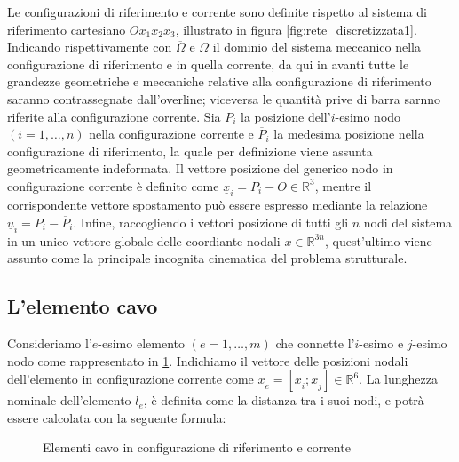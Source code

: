 \vspace{1em}
Le configurazioni di riferimento e corrente sono definite rispetto al sistema di riferimento cartesiano $Ox_{1}x_{2}x_{3}$, illustrato in figura \cref{fig:rete_discretizzata1}. Indicando rispettivamente con $\overline{\Omega}$ e $\Omega$ il dominio del sistema meccanico nella configurazione di riferimento e in quella corrente, da qui in avanti tutte le grandezze geometriche e meccaniche relative alla configurazione di riferimento saranno contrassegnate dall'overline; viceversa le quantità prive di barra sarnno riferite alla configurazione corrente. Sia $P_i$ la posizione dell'$i$-esimo nodo $(i = 1,\dots,n)$ nella configurazione corrente e $\overline{P}_i$ la medesima posizione nella configurazione di riferimento, la quale per definizione viene assunta geometricamente indeformata. Il vettore posizione del generico nodo in configurazione corrente è definito come $\underline{x}_i = P_i - O \in \mathbb{R}^3 $, mentre il corrispondente vettore spostamento può essere espresso mediante la relazione $\underline{u}_i = P_i - \overline{P}_i$. Infine, raccogliendo i vettori posizione di tutti gli $n$ nodi del sistema in un unico vettore globale delle coordiante nodali $x \in \mathbb{R}^{3n}$, quest'ultimo viene assunto come la principale incognita cinematica del problema strutturale. 

\subsection{L'elemento cavo}
Consideriamo l'$e$-esimo elemento $(e = 1,\dots,m)$ che connette l'$i$-esimo e $j$-esimo nodo come rappresentato in \cref{fig:elementocavo}. Indichiamo il vettore delle posizioni nodali dell'elemento in configurazione corrente come $\underline{x}_e = [\underline{x}_i ; \underline{x}_j] \in \mathbb{R}^6$. La lunghezza nominale dell'elemento $l_e$, è definita come la distanza tra i suoi nodi, e potrà essere calcolata con la seguente formula: 

\begin{figure}[htbp]
  \centering
  
  \caption{Elementi cavo in configurazione di riferimento e corrente}
  \label{fig:elementocavo}
\end{figure}


